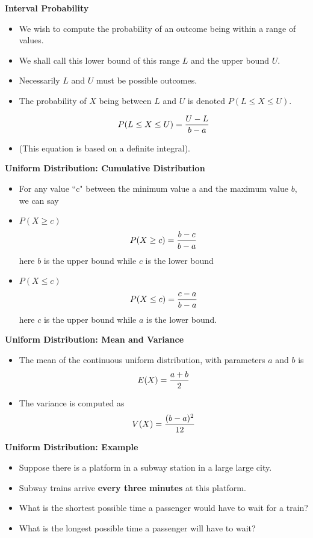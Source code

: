 {\textbf{Interval Probability}

\begin{itemize}
\item We wish to compute the probability of an outcome being within a range of values.
\item We shall call this lower bound of this range $L$ and the upper bound $ U$.
\item Necessarily $L$ and $U$ must be possible outcomes.
\item The probability of $X$ being between $L$ and $U$ is denoted $P( L \leq X \leq U )$.

\[
P( L \leq X \leq U ) = { U - L \over b - a}
\]
\item (This equation is based on a definite integral).
\end{itemize}
}

{
\textbf{Uniform Distribution: Cumulative Distribution}
\begin{itemize}

\item For any value ``c" between the minimum value a and the maximum
value $b$, we can say
\item $P(X \geq c)$ \[P(X \geq c) = {b-c \over b-a}\]
here $b$ is the upper bound while $c$ is the lower bound
\item $P(X \leq c)$ \[P(X \leq c) = {c-a \over b-a}\]
here $c$ is the upper bound while $a$ is the lower bound.
\end{itemize}
}

{
\textbf{Uniform Distribution: Mean and Variance}
\begin{itemize}
\item The mean of the continuous uniform distribution, with parameters $a$ and $b$ is
\[ E(X) = {a+b \over 2}\]
\item The variance is computed as
\[ V(X) = {(b-a)^2 \over 12}\]
\end{itemize}
}
{
\textbf{Uniform Distribution: Example}

\begin{itemize}
\item Suppose there is a platform in a subway station in a large large city. \item Subway trains arrive \textbf{every three minutes} at this platform. \item What is the shortest possible time a passenger would have to wait for a train?
\item What is the longest possible time a passenger will have to wait?
\end{itemize}

}


